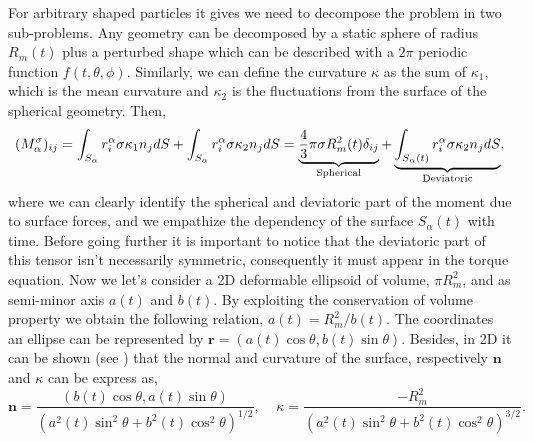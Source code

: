 For arbitrary shaped particles it gives we need to decompose the problem in two sub-problems. 
Any geometry can be decomposed by a static sphere of radius $R_m(t)$ plus a perturbed shape which can be described with a $2\pi$ periodic function $f(t,\theta,\phi)$. 
Similarly, we can define the curvature $\kappa$ as the sum of $\kappa_1$, which is the mean curvature and $\kappa_2$ is the fluctuations from the surface of the spherical geometry. Then,
\begin{equation}
    (M^\sigma_\alpha)_{ij}
    =\int_{S_\alpha}r^\alpha_i \sigma \kappa_1 n_j dS
    +\int_{S_\alpha}r^\alpha_i \sigma \kappa_2 n_j dS\\
    = \underbrace{\frac{4}{3} \pi \sigma R_m^2(t)  \delta_{ij}}_{\text{Spherical}}
    +
    \underbrace{\int_{S_\alpha(t)}r^\alpha_i \sigma \kappa_2 n_j dS}_{\text{Deviatoric}},
\end{equation}
where we can clearly identify the spherical and deviatoric part of the moment due to surface forces,
and we empathize the dependency of the surface $S_\alpha(t)$ with time. 
Before going further it is important to notice that the deviatoric part of this tensor isn't necessarily symmetric, consequently it must appear in the torque equation.
Now we let's consider a 2D deformable ellipsoid of volume, $\pi R_m^2$, and as semi-minor axis $a(t)$ and $b(t)$. 
By exploiting the conservation of volume property we obtain the following relation, 
$a(t) = R^2_m/b(t)$. 
The coordinates an ellipse can be represented by $\bm{r} = (a(t) \cos\theta, b(t)\sin\theta)$. 
Besides, in 2D it can be shown (see \citet{tryggvason2011direct}) that the normal and curvature of the surface, respectively $\bm{n}$ and $\kappa$ can be express as,
\begin{equation}
    \bm{n} 
    = \frac{\left(b(t) \cos\theta, a(t)\sin\theta\right)}{(a^2(t)\sin^2\theta+b^2(t)\cos^2\theta)^{1/2}},
    \;\;\;\;
    \kappa
    = \frac{- R_m^2}{(a^2(t)\sin^2\theta+b^2(t)\cos^2\theta)^{3/2}}.
\end{equation}

